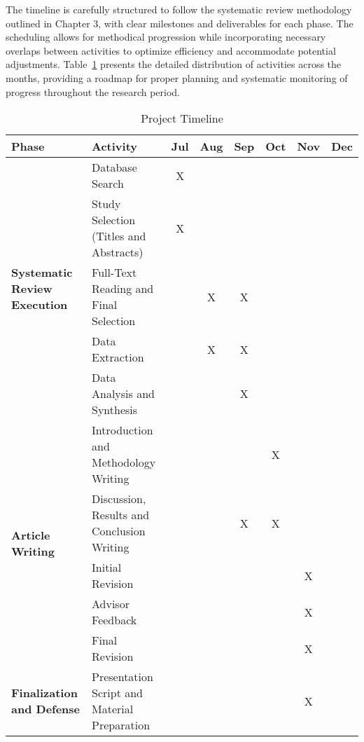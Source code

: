 \documentclass[twoside,brazilian,english]{UNISINOSmonografia}
\begin{document}
The timeline is carefully structured to follow the systematic review methodology outlined in Chapter 3, with clear milestones and deliverables for each phase. The scheduling allows for methodical progression while incorporating necessary overlaps between activities to optimize efficiency and accommodate potential adjustments. Table~\ref{tab:timeline} presents the detailed distribution of activities across the months, providing a roadmap for proper planning and systematic monitoring of progress throughout the research period.

\begin{table}[htbp]
    \caption{Project Timeline}
    \label{tab:timeline}
    \centering%
    \begin{minipage}{\textwidth}
        \footnotesize
        \renewcommand{\arraystretch}{1.2}
        \begin{tabular}{|m{3.2cm}|m{4.3cm}|c|c|c|c|c|c|}
            \hline
            \textbf{Phase} & \textbf{Activity} & \textbf{Jul} & \textbf{Aug} & \textbf{Sep} & \textbf{Oct} & \textbf{Nov} & \textbf{Dec} \\
            \hline
            \multirow{5}{3.2cm}{\centering\textbf{Systematic Review Execution}} 
            & Database Search & X& & & & & \\
            \cline{2-8}
            & Study Selection (Titles and Abstracts) & X& & & & & \\
            \cline{2-8}
            & Full-Text Reading and Final Selection & & X& X& & & \\
            \cline{2-8}
            & Data Extraction & & X& X& & & \\
            \cline{2-8}
            & Data Analysis and Synthesis & & & X& & & \\
            \hline
            \multirow{5}{3.2cm}{\centering\textbf{Article Writing}} 
            & Introduction and Methodology Writing & & & & X& & \\
            \cline{2-8}
            & Discussion, Results and Conclusion Writing & & & X& X& & \\
            \cline{2-8}
            & Initial Revision & & & & & X& \\
            \cline{2-8}
            & Advisor Feedback & & & & & X& \\
            \cline{2-8}
            & Final Revision & & & & & X& \\
            \hline
            \multirow{4}{3.2cm}{\centering\textbf{Finalization and Defense}} 
            & Presentation Script and Material Preparation & & & & & X& \\

\end{tabular}
\end{minipage}
\end{table}
\end{document}

